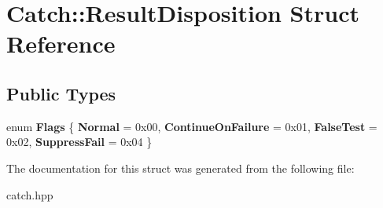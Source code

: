 \hypertarget{structCatch_1_1ResultDisposition}{
\section{Catch::ResultDisposition Struct Reference}
\label{structCatch_1_1ResultDisposition}
}
\subsection*{Public Types}
\begin{DoxyCompactItemize}
\item 
enum {\bfseries Flags} \{ {\bfseries Normal} =  0x00, 
{\bfseries ContinueOnFailure} =  0x01, 
{\bfseries FalseTest} =  0x02, 
{\bfseries SuppressFail} =  0x04
 \}
\end{DoxyCompactItemize}


The documentation for this struct was generated from the following file:\begin{DoxyCompactItemize}
\item 
catch.hpp\end{DoxyCompactItemize}
